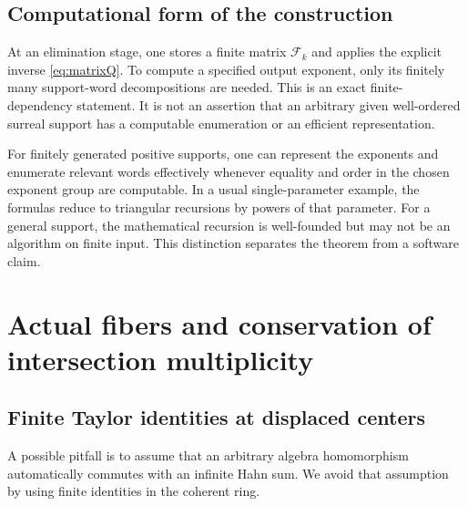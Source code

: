 \documentclass[11pt,oneside]{article}
\numberwithin{equation}{section}
\theoremstyle{definition}
\theoremstyle{remark}\newtheorem{remark}[theorem]{Remark}
\begin{document}
\subsection{Computational form of the construction}
At an elimination stage, one stores a finite matrix \(\mathcal F_k\) and applies the explicit inverse \eqref{eq:matrixQ}. To compute a specified output exponent, only its finitely many support-word decompositions are needed. This is an exact finite-dependency statement. It is not an assertion that an arbitrary given well-ordered surreal support has a computable enumeration or an efficient representation.

For finitely generated positive supports, one can represent the exponents and enumerate relevant words effectively whenever equality and order in the chosen exponent group are computable. In a usual single-parameter example, the formulas reduce to triangular recursions by powers of that parameter. For a general support, the mathematical recursion is well-founded but may not be an algorithm on finite input. This distinction separates the theorem from a software claim.

\section{Actual fibers and conservation of intersection multiplicity}\label{sec:fibers}
\subsection{Finite Taylor identities at displaced centers}
A possible pitfall is to assume that an arbitrary algebra homomorphism automatically commutes with an infinite Hahn sum. We avoid that assumption by using finite identities in the coherent ring.
\end{document}
